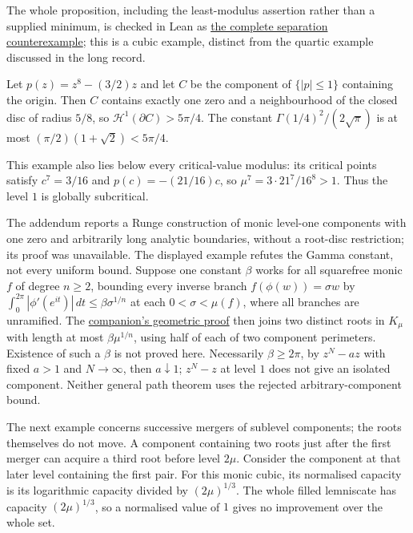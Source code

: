 \documentclass[11pt]{article}
\begin{document}
\noindent The whole proposition, including the least-modulus assertion rather
than a supplied minimum, is checked in Lean as
\href{https://github.com/wcook04/plectis-erdos/blob/0b500c7cf8e8bb7ae343484378df02f277fb8194/lean/ErdosProblems/Erdos1041/PaperSeparationCounterexample.lean#L189}{the complete separation counterexample}; this is a cubic example, distinct from the quartic example discussed in
the long record.

\begin{proposition}
\label{res:one-root-gamma-false}
Let $p(z)=z^8-(3/2)z$ and let $C$ be the component of $\{|p|\le1\}$
containing the origin.  Then $C$ contains exactly one zero and a
neighbourhood of the closed disc of radius $5/8$, so
$\mathcal H^1(\partial C)>5\pi/4$.  The constant
$\Gamma(1/4)^2/(2\sqrt{\pi})$ is at most $(\pi/2)(1+\sqrt2)<5\pi/4$.
\end{proposition}

This example also lies below every critical-value modulus: its critical
points satisfy $c^7=3/16$ and $p(c)=-(21/16)c$, so
$\mu^7=3\cdot21^7/16^8>1$. Thus the level $1$ is globally subcritical.

The addendum \cite[Proposition~2]{revision2026} reports a Runge construction
of monic level-one components with one zero and arbitrarily long analytic
boundaries, without a root-disc restriction; its proof was unavailable.
The displayed example refutes the Gamma constant, not every uniform bound.
Suppose one constant $\beta$ works for all squarefree monic $f$ of degree
$n\ge2$, bounding every inverse branch $f(\phi(w))=\sigma w$ by
$\int_0^{2\pi}|\phi'(e^{it})|\,dt\le\beta\sigma^{1/n}$ at each
$0<\sigma<\mu(f)$, where all branches are unramified.
The \href{erdos1041-lemniscate-reasoning-surface.pdf\#perimeter-to-path}{companion's geometric proof}
then joins two distinct roots in $K_\mu$ with length at most
$\beta\mu^{1/n}$, using half of each of two component perimeters. Existence of such a $\beta$ is not proved here.
Necessarily $\beta\ge2\pi$, by $z^N-az$ with fixed $a>1$ and $N\to\infty$,
then $a\downarrow1$; $z^N-z$ at level $1$ does not give an isolated component.
Neither general path theorem uses the rejected arbitrary-component bound.

The next example concerns successive mergers of sublevel components;
the roots themselves do not move. A component containing two roots just
after the first merger can acquire a third root before level $2\mu$.
Consider the component at that later level containing the first pair.
For this monic cubic, its normalised capacity is its logarithmic capacity
divided by $(2\mu)^{1/3}$. The whole filled lemniscate has capacity
$(2\mu)^{1/3}$, so a normalised value of $1$ gives no improvement over
the whole set.
\end{document}
